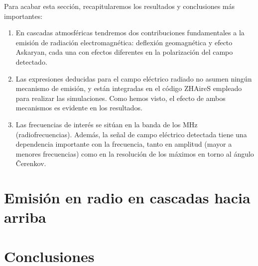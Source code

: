 \documentclass[12 pt, a4paper]{article} %
\numberwithin{equation}{section}
\numberwithin{figure}{section}
\numberwithin{table}{section}
\begin{document}
Para acabar esta sección, recapitularemos los resultados y conclusiones más importantes:
\begin{enumerate}
	\item En cascadas atmosféricas tendremos dos contribuciones fundamentales a la emisión de radiación electromagnética: deflexión geomagnética y efecto Askaryan, cada una con efectos diferentes en la polarización del campo detectado.
	\item Las expresiones deducidas para el campo eléctrico radiado no asumen ningún mecanismo de emisión, y están integradas en el código ZHAireS empleado para realizar las simulaciones. Como hemos visto, el efecto de ambos mecanismos es evidente en los resultados.
	\item Las frecuencias de interés se sitúan en la banda de los $\mathrm{MHz}$ (radiofrecuencias). Además, la señal de campo eléctrico detectada tiene una dependencia importante con la frecuencia, tanto en amplitud (mayor a menores frecuencias) como en la resolución de los máximos en torno al ángulo \v{C}erenkov.
\end{enumerate}
\clearpage

	\section{Emisión en radio en cascadas hacia arriba}
	\clearpage %
	\section{Conclusiones}
	
	
	\clearpage
	\appendix
	
	\nocite{*}
	
	

	
\end{document}
